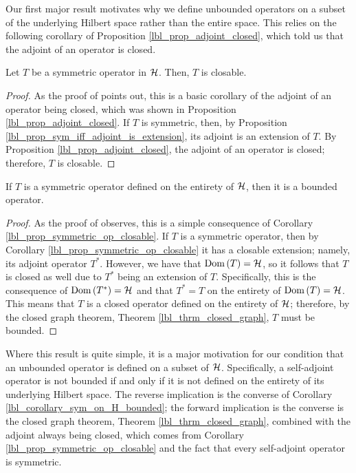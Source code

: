 Our first major result motivates why we define unbounded operators on a subset of the underlying Hilbert space rather than the entire space. This relies on the following corollary of Proposition \eqref{lbl_prop_adjoint_closed}, which told us that the adjoint of an operator is closed.

\begin{corollary}\label{lbl_prop_symmetric_op_closable}
  Let $T$ be a symmetric operator in $\mathcal{H}$. Then, $T$ is closable.
\end{corollary}
\begin{proof}
  As the proof of {\cite[Proposition 9.8]{Hall2013}} points out, this is a basic corollary of the adjoint of an operator being closed, which was shown in Proposition \eqref{lbl_prop_adjoint_closed}. If $T$ is symmetric, then, by Proposition \eqref{lbl_prop_sym_iff_adjoint_is_extension}, its adjoint is an extension of $T$. By Proposition \eqref{lbl_prop_adjoint_closed}, the adjoint of an operator is closed; therefore, $T$ is closable.
\end{proof}

\begin{corollary}\label{lbl_corollary_sym_on_H_bounded}
  If $T$ is a symmetric operator defined on the entirety of $\mathcal{H}$, then it is a bounded operator.
\end{corollary}
\begin{proof}
  As the proof of {\cite[Proposition 9.9]{Hall2013}} observes, this is a simple consequence of Corollary \eqref{lbl_prop_symmetric_op_closable}. If $T$ is a symmetric operator, then by Corollary \eqref{lbl_prop_symmetric_op_closable} it has a closable extension; namely, its adjoint operator $T^*$. However, we have that $\operatorname{Dom}\left(T\right) = \mathcal{H}$, so it follows that $T$ is closed as well due to $T^*$ being an extension of $T$. Specifically, this is the consequence of $\operatorname{Dom}\left(T^*\right) = \mathcal{H}$ and that $T^* = T$ on the entirety of $\operatorname{Dom}\left(T\right) = \mathcal{H}$. This means that $T$ is a closed operator defined on the entirety of $\mathcal{H}$; therefore, by the closed graph theorem, Theorem \eqref{lbl_thrm_closed_graph}, $T$ must be bounded.
\end{proof}

Where this result is quite simple, it is a major motivation for our condition that an unbounded operator is defined on a subset of $\mathcal{H}$. Specifically, a self-adjoint operator is not bounded if and only if it is not defined on the entirety of its underlying Hilbert space. The reverse implication is the converse of Corollary \eqref{lbl_corollary_sym_on_H_bounded}; the forward implication is the converse is the closed graph theorem, Theorem \eqref{lbl_thrm_closed_graph}, combined with the adjoint always being closed, which comes from Corollary \eqref{lbl_prop_symmetric_op_closable} and the fact that every self-adjoint operator is symmetric.

